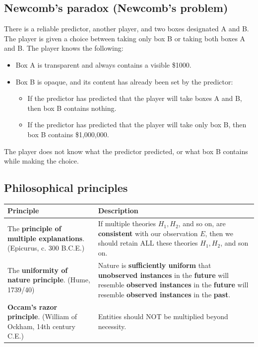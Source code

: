 \documentclass[11pt]{article}
\begin{document}
\subsection{Newcomb's paradox (Newcomb's problem)}
\label{sec:org2ff4de8}
There is a reliable predictor, another player, and two boxes designated A and B. The player is given a choice between taking only box B or taking both boxes A and B. The player knows the following:
\begin{itemize}
\item Box A is transparent and always contains a visible \$1000.
\item Box B is opaque, and its content has already been set by the predictor:
\begin{itemize}
\item If the predictor has predicted that the player will take boxes A and B, then box B contains nothing.
\item If the predictor has predicted that the player will take only box B, then box B contains \$1,000,000.
\end{itemize}
\end{itemize}

The player does not know what the predictor predicted, or what box B contains while making the choice.
\subsection{Philosophical principles}
\label{sec:org83b34dd}
\begin{center}
\begin{tabularx}{\textwidth}{|X|X|}
\hline
Principle & Description\\
\hline
The \textbf{principle of multiple explanations}. (Epicurus, c. 300 B.C.E.) & If multiple theories \(H_1, H_2\), and so on, are \textbf{consistent} with our observation \(E\), then we should retain ALL these theories \(H_1, H_2\), and son on.\\
\hline
The \textbf{uniformity of nature principle}. (Hume, 1739/40) & Nature is \textbf{sufficiently uniform} that \textbf{unobserved instances} in the \textbf{future} will resemble \textbf{observed instances} in the \textbf{future} will resemble \textbf{observed instances} in the \textbf{past}.\\
\hline
\textbf{Occam's razor principle}. (William of Ockham, 14th century C.E.) & Entities should NOT be multiplied beyond necessity.\\
\hline
\end{tabularx}
\end{center}
 \newpage
\end{document}
